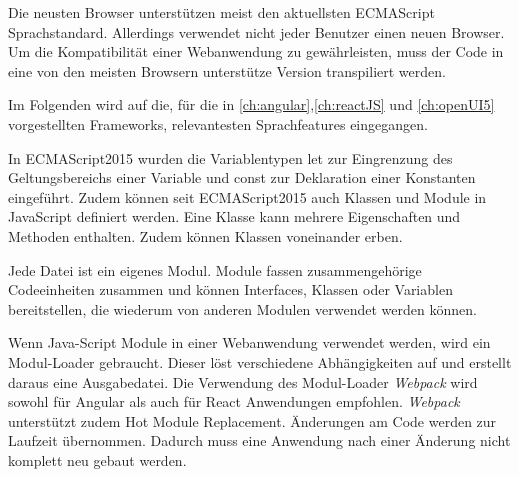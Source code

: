 Die neusten Browser unterstützen meist den aktuellsten ECMAScript Sprachstandard. Allerdings verwendet nicht jeder Benutzer einen neuen Browser. Um die Kompatibilität einer Webanwendung zu gewährleisten, muss der Code in eine von den meisten Browsern unterstütze Version transpiliert werden.\autocites[vgl.][27\psqq]{Woiwode.2018}[vgl.][]{Terlson.2018}[vgl.][13\psqq]{Steyer.2017}

Im Folgenden wird auf die, für die in \autoref{ch:angular},\ref{ch:reactJS} und \ref{ch:openUI5} vorgestellten Frameworks, relevantesten Sprachfeatures eingegangen.  

In ECMAScript2015 wurden die Variablentypen let zur Eingrenzung des Geltungsbereichs einer Variable und const zur Deklaration einer Konstanten eingeführt. Zudem können seit ECMAScript2015 auch Klassen und Module in JavaScript definiert werden. Eine Klasse kann mehrere Eigenschaften und Methoden enthalten. Zudem können Klassen voneinander erben.

Jede Datei ist ein eigenes Modul. Module fassen zusammengehörige Codeeinheiten zusammen und können Interfaces, Klassen oder Variablen bereitstellen, die wiederum von anderen Modulen verwendet werden können.\autocites[vgl.][34\psq]{Woiwode.2018}[vgl.][19\psqq]{Steyer.2017}


\label{Webpack}
Wenn Java-Script Module in einer Webanwendung verwendet werden, wird ein Modul-Loader gebraucht. Dieser löst verschiedene Abhängigkeiten auf und erstellt daraus eine Ausgabedatei. Die Verwendung des Modul-Loader \textit{Webpack} wird sowohl für Angular als auch für React Anwendungen empfohlen. \textit{Webpack} unterstützt zudem Hot Module Replacement. Änderungen am Code werden zur Laufzeit übernommen. Dadurch muss eine Anwendung nach einer Änderung nicht komplett neu gebaut werden.\autocites[vgl.][13,21]{Woiwode.2018}[vgl.][9,295-301]{Zeigermann.2016}[vgl.][]{Hlushko.2018}


%
%

